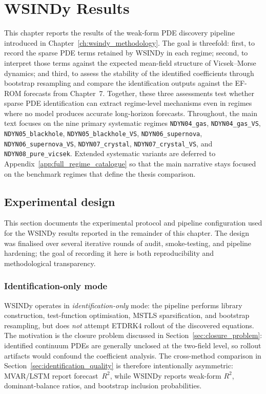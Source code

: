 \chapter{WSINDy Results}
\label{ch:wsindy_results}

This chapter reports the results of the weak-form PDE discovery pipeline
introduced in Chapter~\ref{ch:wsindy_methodology}.  The goal is threefold:
first, to record the sparse PDE terms retained by WSINDy in each regime;
second, to interpret those terms against the expected mean-field structure of
Vicsek--Morse dynamics; and third, to assess the stability of the identified
coefficients through bootstrap resampling and compare the identification
outputs against the EF-ROM forecasts from Chapter~7.  Together, these three
assessments test whether sparse PDE identification can extract
regime-level mechanisms even in regimes where no model produces accurate
long-horizon forecasts.  Throughout, the main
text focuses on the nine primary systematic regimes
\texttt{NDYN04\_gas}, \texttt{NDYN04\_gas\_VS},
\texttt{NDYN05\_blackhole}, \texttt{NDYN05\_blackhole\_VS},
\texttt{NDYN06\_supernova}, \texttt{NDYN06\_supernova\_VS},
\texttt{NDYN07\_crystal}, \texttt{NDYN07\_crystal\_VS},
and \texttt{NDYN08\_pure\_vicsek}.  Extended systematic variants are deferred to
Appendix~\ref{app:full_regime_catalogue} so that the main narrative stays focused on the benchmark
regimes that define the thesis comparison.

\section{Experimental design}
\label{sec:wsindy_experimental_design}

This section documents the experimental protocol and pipeline configuration
used for the WSINDy results reported in the remainder of this
chapter.  The design was finalised over several iterative rounds of audit,
smoke-testing, and pipeline hardening; the goal of recording it here is both
reproducibility and methodological transparency.

\subsection{Identification-only mode}

WSINDy operates in \emph{identification-only} mode: the pipeline performs
library construction, test-function optimisation, MSTLS sparsification, and
bootstrap resampling, but does \emph{not} attempt ETDRK4 rollout of the
discovered equations.  The motivation is the closure problem discussed in
Section~\ref{sec:closure_problem}: identified continuum PDEs are generally
unclosed at the two-field level, so rollout artifacts would confound the
coefficient analysis.  The cross-method comparison in
Section~\ref{sec:identification_quality} is therefore intentionally
asymmetric: MVAR/LSTM report forecast~$R^2$, while WSINDy reports weak-form
$R^2$, dominant-balance ratios, and bootstrap inclusion probabilities.

